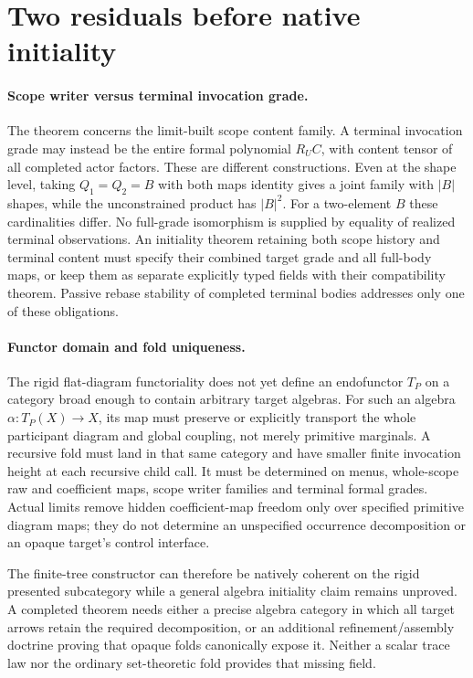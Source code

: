 \documentclass[11pt]{article}
\begin{document}
\section{Two residuals before native initiality}
\paragraph{Scope writer versus terminal invocation grade.}
The theorem concerns the limit-built scope content family. A terminal invocation grade may instead be the entire formal polynomial $R_UC$, with content tensor of all completed actor factors. These are different constructions. Even at the shape level, taking $Q_1=Q_2=B$ with both maps identity gives a joint family with $|B|$ shapes, while the unconstrained product has $|B|^2$. For a two-element $B$ these cardinalities differ. No full-grade isomorphism is supplied by equality of realized terminal observations. An initiality theorem retaining both scope history and terminal content must specify their combined target grade and all full-body maps, or keep them as separate explicitly typed fields with their compatibility theorem. Passive rebase stability of completed terminal bodies addresses only one of these obligations.

\paragraph{Functor domain and fold uniqueness.}
The rigid flat-diagram functoriality does not yet define an endofunctor $T_P$ on a category broad enough to contain arbitrary target algebras. For such an algebra $\alpha:T_P(X)\to X$, its map must preserve or explicitly transport the whole participant diagram and global coupling, not merely primitive marginals. A recursive fold must land in that same category and have smaller finite invocation height at each recursive child call. It must be determined on menus, whole-scope raw and coefficient maps, scope writer families and terminal formal grades. Actual limits remove hidden coefficient-map freedom only over specified primitive diagram maps; they do not determine an unspecified occurrence decomposition or an opaque target's control interface.

The finite-tree constructor can therefore be natively coherent on the rigid presented subcategory while a general algebra initiality claim remains unproved. A completed theorem needs either a precise algebra category in which all target arrows retain the required decomposition, or an additional refinement/assembly doctrine proving that opaque folds canonically expose it. Neither a scalar trace law nor the ordinary set-theoretic fold provides that missing field.
\end{document}
